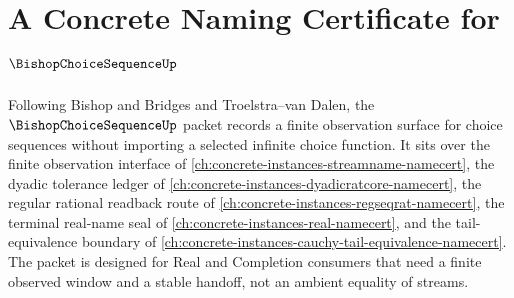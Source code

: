 \chapter{A Concrete Naming Certificate for $\BishopChoiceSequenceUp$}
\label{ch:concrete-instances-bishop-choice-sequence-namecert}

Following Bishop and Bridges and Troelstra--van Dalen, the $\BishopChoiceSequenceUp$ packet records a finite observation surface for choice sequences without importing a selected infinite choice function. It sits over the finite observation interface of \autoref{ch:concrete-instances-streamname-namecert}, the dyadic tolerance ledger of \autoref{ch:concrete-instances-dyadicratcore-namecert}, the regular rational readback route of \autoref{ch:concrete-instances-regseqrat-namecert}, the terminal real-name seal of \autoref{ch:concrete-instances-real-namecert}, and the tail-equivalence boundary of \autoref{ch:concrete-instances-cauchy-tail-equivalence-namecert}. The packet is designed for Real and Completion consumers that need a finite observed window and a stable handoff, not an ambient equality of streams.

